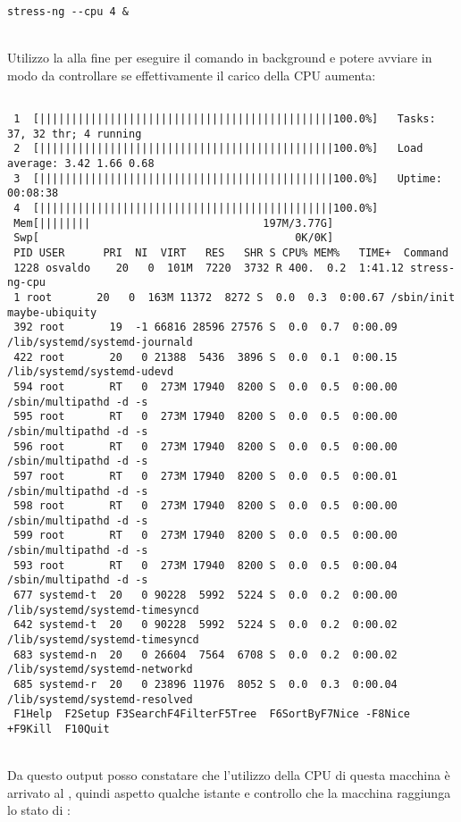 \begin{lstlisting}[style=cmd]
 stress-ng --cpu 4 &
\end{lstlisting}
\ \\
Utilizzo la \icode{\&} alla fine per eseguire il comando in background e potere avviare  in modo da controllare se effettivamente il carico della CPU aumenta:

\begin{lstlisting}[style=output_tiny]
                                                                                 
 1  [||||||||||||||||||||||||||||||||||||||||||||||100.0%]   Tasks: 37, 32 thr; 4 running
 2  [||||||||||||||||||||||||||||||||||||||||||||||100.0%]   Load average: 3.42 1.66 0.68 
 3  [||||||||||||||||||||||||||||||||||||||||||||||100.0%]   Uptime: 00:08:38          
 4  [||||||||||||||||||||||||||||||||||||||||||||||100.0%]                             
 Mem[||||||||                           197M/3.77G]                             
 Swp[                                        0K/0K]                             
 PID USER      PRI  NI  VIRT   RES   SHR S CPU% MEM%   TIME+  Command        
 1228 osvaldo    20   0  101M  7220  3732 R 400.  0.2  1:41.12 stress-ng-cpu  
 1 root       20   0  163M 11372  8272 S  0.0  0.3  0:00.67 /sbin/init maybe-ubiquity
 392 root       19  -1 66816 28596 27576 S  0.0  0.7  0:00.09 /lib/systemd/systemd-journald
 422 root       20   0 21388  5436  3896 S  0.0  0.1  0:00.15 /lib/systemd/systemd-udevd
 594 root       RT   0  273M 17940  8200 S  0.0  0.5  0:00.00 /sbin/multipathd -d -s
 595 root       RT   0  273M 17940  8200 S  0.0  0.5  0:00.00 /sbin/multipathd -d -s
 596 root       RT   0  273M 17940  8200 S  0.0  0.5  0:00.00 /sbin/multipathd -d -s
 597 root       RT   0  273M 17940  8200 S  0.0  0.5  0:00.01 /sbin/multipathd -d -s
 598 root       RT   0  273M 17940  8200 S  0.0  0.5  0:00.00 /sbin/multipathd -d -s
 599 root       RT   0  273M 17940  8200 S  0.0  0.5  0:00.00 /sbin/multipathd -d -s
 593 root       RT   0  273M 17940  8200 S  0.0  0.5  0:00.04 /sbin/multipathd -d -s
 677 systemd-t  20   0 90228  5992  5224 S  0.0  0.2  0:00.00 /lib/systemd/systemd-timesyncd
 642 systemd-t  20   0 90228  5992  5224 S  0.0  0.2  0:00.02 /lib/systemd/systemd-timesyncd
 683 systemd-n  20   0 26604  7564  6708 S  0.0  0.2  0:00.02 /lib/systemd/systemd-networkd
 685 systemd-r  20   0 23896 11976  8052 S  0.0  0.3  0:00.04 /lib/systemd/systemd-resolved
 F1Help  F2Setup F3SearchF4FilterF5Tree  F6SortByF7Nice -F8Nice +F9Kill  F10Quit 
\end{lstlisting}
\ \\
Da questo output posso constatare che l'utilizzo della CPU di questa macchina \`{e} arrivato al , quindi aspetto qualche istante e controllo che la macchina raggiunga lo stato di :

